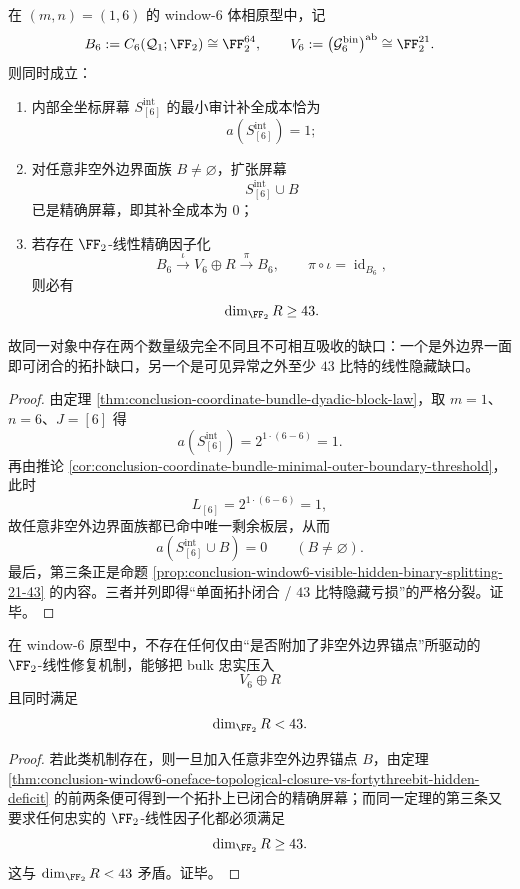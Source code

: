 \begin{theorem}\label{thm:conclusion-window6-oneface-topological-closure-vs-fortythreebit-hidden-deficit}
在 \((m,n)=(1,6)\) 的 window-\(6\) 体相原型中，记
\[
B_6:=C_6(\mathcal Q_1;\FF_2)\cong \FF_2^{64},
\qquad
V_6:=\bigl(\mathcal G_6^{\mathrm{bin}}\bigr)^{\mathrm{ab}}\cong \FF_2^{21}.
\]
则同时成立：
\begin{enumerate}
  \item 内部全坐标屏幕 \(S_{[6]}^{\mathrm{int}}\) 的最小审计补全成本恰为
        \[
        a\!\left(S_{[6]}^{\mathrm{int}}\right)=1;
        \]
  \item 对任意非空外边界面族 \(B\neq \varnothing\)，扩张屏幕
        \[
        S_{[6]}^{\mathrm{int}}\cup B
        \]
        已是精确屏幕，即其补全成本为 \(0\)；
  \item 若存在 \(\FF_2\)-线性精确因子化
        \[
        B_6\xrightarrow{\ \iota\ } V_6\oplus R
        \xrightarrow{\ \pi\ } B_6,
        \qquad
        \pi\circ\iota=\operatorname{id}_{B_6},
        \]
        则必有
        \[
        \dim_{\FF_2}R\ge 43.
        \]
\end{enumerate}
故同一对象中存在两个数量级完全不同且不可相互吸收的缺口：一个是外边界一面即可闭合的拓扑缺口，另一个是可见异常之外至少 \(43\) 比特的线性隐藏缺口。
\end{theorem}
\begin{proof}
由定理 \ref{thm:conclusion-coordinate-bundle-dyadic-block-law}，取 \(m=1\)、\(n=6\)、\(J=[6]\) 得
\[
a\!\left(S_{[6]}^{\mathrm{int}}\right)=2^{1\cdot(6-6)}=1.
\]
再由推论 \ref{cor:conclusion-coordinate-bundle-minimal-outer-boundary-threshold}，此时
\[
L_{[6]}=2^{1\cdot(6-6)}=1,
\]
故任意非空外边界面族都已命中唯一剩余板层，从而
\[
a\!\left(S_{[6]}^{\mathrm{int}}\cup B\right)=0
\qquad(B\neq\varnothing).
\]
最后，第三条正是命题 \ref{prop:conclusion-window6-visible-hidden-binary-splitting-21-43} 的内容。三者并列即得“单面拓扑闭合 / \(43\) 比特隐藏亏损”的严格分裂。证毕。
\end{proof}

\begin{proposition}\label{prop:conclusion-window6-topological-closure-not-anomaly-closure}
在 window-\(6\) 原型中，不存在任何仅由“是否附加了非空外边界锚点”所驱动的 \(\FF_2\)-线性修复机制，能够把 bulk 忠实压入
\[
V_6\oplus R
\]
且同时满足
\[
\dim_{\FF_2}R<43.
\]
\end{proposition}
\begin{proof}
若此类机制存在，则一旦加入任意非空外边界锚点 \(B\)，由定理 \ref{thm:conclusion-window6-oneface-topological-closure-vs-fortythreebit-hidden-deficit} 的前两条便可得到一个拓扑上已闭合的精确屏幕；而同一定理的第三条又要求任何忠实的 \(\FF_2\)-线性因子化都必须满足
\[
\dim_{\FF_2}R\ge 43.
\]
这与 \(\dim_{\FF_2}R<43\) 矛盾。证毕。
\end{proof}

